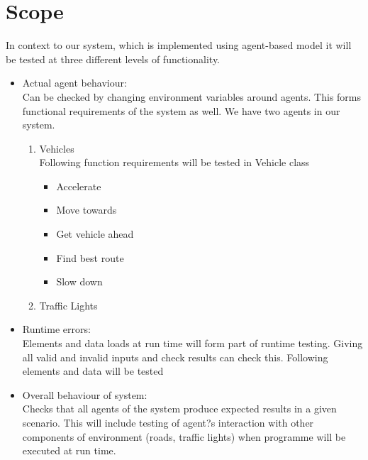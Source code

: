 \documentclass[11pt, oneside]{article}   	%
\begin{document}
\section{Scope}
In context to our system, which is implemented using agent-based model it will be tested at three different levels of functionality.
\begin{itemize}
\item Actual agent behaviour: \hfill \\
Can be checked by changing environment variables around agents.
This forms functional requirements of the system as well. We have two agents in our system. \begin{enumerate}
\item Vehicles\hfill \\
Following function requirements will be tested in Vehicle class

\begin{itemize}
	\item Accelerate
	\item Move towards
	\item Get vehicle ahead
	\item Find best route
	\item Slow down
\end{itemize}

\item Traffic Lights
 \end{enumerate}
\item Runtime errors: \hfill \\
Elements and data loads at run time will form part of runtime testing. Giving all valid and invalid inputs and check results can check this. Following elements and data will be tested
\item Overall behaviour of system: \hfill \\
Checks that all agents of the system produce expected results in a given scenario. This will include testing of agent?s interaction with other components of environment (roads, traffic lights) when programme will be executed at run time.
\end{itemize}
\end{document}
